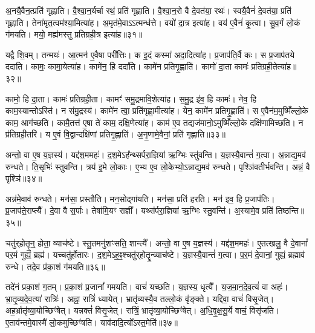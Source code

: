अ॒नयै॒वैन॒त्प्रति॑ गृह्णाति।
वै॒श्वा॒न॒र्यर्चा रथं॒ प्रति॑ गृह्णाति।
वै॒श्वा॒न॒रो वै दे॒वत॑या॒ रथः॑।
स्वयै॒वैनं॑ दे॒वत॑या॒ प्रति॑ गृह्णाति।
तेना॑मृत॒त्वम॑श्या॒मित्या॑ह।
अ॒मृत॑मे॒वाऽऽत्मन्ध॑त्ते।
वयो॑ दा॒त्र इत्या॑ह।
वय॑ ए॒वैनं॑ कृ॒त्वा।
सु॒व॒र्गं लो॒कं ग॑मयति।
मयो॒ मह्य॑मस्तु प्रतिग्रही॒त्र इत्या॑ह॥३१॥\ip

यद्वै शि॒वम्।
तन्मयः॑।
आ॒त्मन॑ ए॒वैषा परी᳚त्तिः।
क इ॒दं कस्मा॑ अदा॒दित्या॑ह।
प्र॒जा\-प॑ति॒र्वै कः।
स प्र॒जा\-प॑तये ददाति।
कामः॒ कामा॒येत्या॑ह।
कामे॑न॒ हि ददा॑ति।
कामे॑न प्रति\-गृ॒ह्णाति॑।
कामो॑ दा॒ता कामः॑ प्रतिग्रही॒तेत्या॑ह॥३२॥\ip

कामो॒ हि दा॒ता।
कामः॑ प्रतिग्रही॒ता।
कामꣳ॑ समु॒द्रमावि॒शे\-त्या॑ह।
स॒मु॒द्र इ॑व॒ हि कामः॑।
नेव॒ हि काम॒स्यान्तो\-ऽस्ति॑।
न स॑मु॒द्रस्य॑।
कामे॑न त्वा॒ प्रति॑\-गृह्णा॒मीत्या॑ह।
येन॒ कामे॑न प्रति\-गृ॒ह्णाति॑।
स ए॒वैन॑म॒मुष्मिँ॑ल्लो॒के काम॒ आग॑च्छति।
कामै॒तत्त॑ ए॒षा ते॑ काम॒ दक्षि॒णेत्या॑ह।
काम॑ ए॒व तद्यज॑मानो॒\-ऽमुष्मिँ॑ल्लो॒के दक्षि॑णामिच्छति।
न प्र॑तिग्रही॒तरि॑।
य ए॒वं वि॒द्वान्दक्षि॑णां प्रति\-गृ॒ह्णाति॑।
अ॒नृ॒णामे॒वैनां॒ प्रति॑ गृह्णाति॥३३॥\ip\anuvakamend[व्ली॒ना॒त्यश्व॒मित्या॑हाङ्गीर॒सः प्र॑तिग्रही॒त्र इत्या॑ह प्रतिग्रही॒तेत्या॑ह॒ दक्षि॒णेत्या॑ह च॒त्वारि॑ च]

अन्तो॒ वा ए॒ष य॒ज्ञस्य॑।
यद्द॑श॒ममहः॑।
द॒श॒मे\-ऽह᳚न्थ्सर्परा॒ज्ञिया॑ ऋ॒ग्भिः स्तु॑वन्ति।
य॒ज्ञस्यै॒वान्तं॑ ग॒त्वा।
अ॒न्नाद्य॒मव॑ रुन्धते।
ति॒सृभिः॑ स्तुवन्ति।
त्रय॑ इ॒मे लो॒काः।
ए॒भ्य ए॒व लो॒केभ्यो॒\-ऽन्नाद्य॒मव॑ रुन्धते।
पृश्ञि॑वतीर्भवन्ति।
अन्नं॒ वै पृश्ञि॑॥३४॥\ip

अन्न॑मे॒वाव॑ रुन्धते।
मन॑सा॒ प्रस्तौ॑ति।
मन॒सोद्गा॑यति।
मन॑सा॒ प्रति॑ हरति।
मन॑ इव॒ हि प्र॒जा\-प॑तिः।
प्र॒जा\-प॑ते॒राप्त्यै᳚।
दे॒वा वै स॒र्पाः।
तेषा॑मि॒यꣳ राज्ञी᳚।
यथ्स॑र्परा॒ज्ञिया॑ ऋ॒ग्भिः स्तु॒वन्ति॑।
अ॒स्यामे॒व प्रति॑ तिष्ठन्ति॥३५॥\ip

चतु॑र्‌\mbox{}होतॄ॒न्॒ होता॒ व्याच॑ष्टे।
स्तु॒तमनु॑शꣳसति॒ शान्त्यै᳚।
अन्तो॒ वा ए॒ष य॒ज्ञस्य॑।
यद्द॑श॒ममहः॑।
ए॒तत्खलु॒ वै दे॒वानां᳚ पर॒मं गुह्यं॒ ब्रह्म॑।
यच्चतु॑र्\mbox{}होतारः।
द॒श॒मे\-ऽह॒ꣴ॒श्चतु॑र्\-‌होतॄ॒न्व्याच॑ष्टे।
य॒ज्ञस्यै॒वान्तं॑ ग॒त्वा।
प॒र॒मं दे॒वानां॒ गुह्यं॒ ब्रह्माव॑ रुन्धे।
तदे॒व प्र॑का॒शं ग॑मयति॥३६॥\ip

तदे॑नं प्रका॒शं ग॒तम्।
प्र॒का॒शं प्र॒जानां᳚ गमयति।
वाचं॑ यच्छति।
य॒ज्ञस्य॒ धृत्यै᳚।
य॒ज॒मा॒न॒दे॒व॒त्यं॑ वा अहः॑।
भ्रा॒तृ॒व्य॒दे॒व॒त्या॑ रात्रिः॑।
अह्ना॒ रात्रिं॑ ध्यायेत्।
भ्रातृ॑व्यस्यै॒व तल्लो॒कं वृ॑ङ्क्ते।
यद्दिवा॒ वाचं॑ विसृ॒जेत्।
अह॒र्भ्रातृ॑व्या॒योच्छिꣳ॑षेत्।
यन्नक्तं॑ विसृ॒जेत्।
रात्रिं॒ भ्रातृ॑व्या॒योच्छिꣳ॑षेत्।
अ॒धि॒वृ॒क्ष॒सू॒र्ये वाचं॒ विसृ॑जति।
ए॒ताव॑न्तमे॒वास्मै॑ लो॒कमुच्छिꣳ॑षति।
याव॑दादि॒त्यो᳚\-ऽस्त॒मेति॑॥३७॥\ip\anuvakamend[पृश्ञि॑ तिष्ठन्ति गमयति शिꣳषे॒त्पञ्च॑ च]

